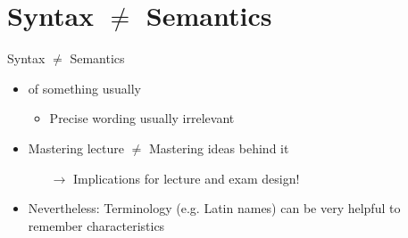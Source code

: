 \documentclass{ercisbeamer}
\begin{document}
\section{Syntax $\ne$ Semantics}
\begin{frame}{Syntax $\ne$ Semantics}
    \begin{tbox}
        \begin{itemize}
            \item {} of something usually 
            \begin{itemize}
                \item Precise wording usually irrelevant
            \end{itemize}
            \item Mastering lecture $\ne$ Mastering ideas behind it
                \begin{itemize}
                    \item[$\rightarrow$] Implications for lecture and exam design!
                \end{itemize}
            \item Nevertheless: Terminology (e.g. Latin names) can be very helpful to remember characteristics
        \end{itemize}
    \end{tbox}
\end{frame}


\end{document}
